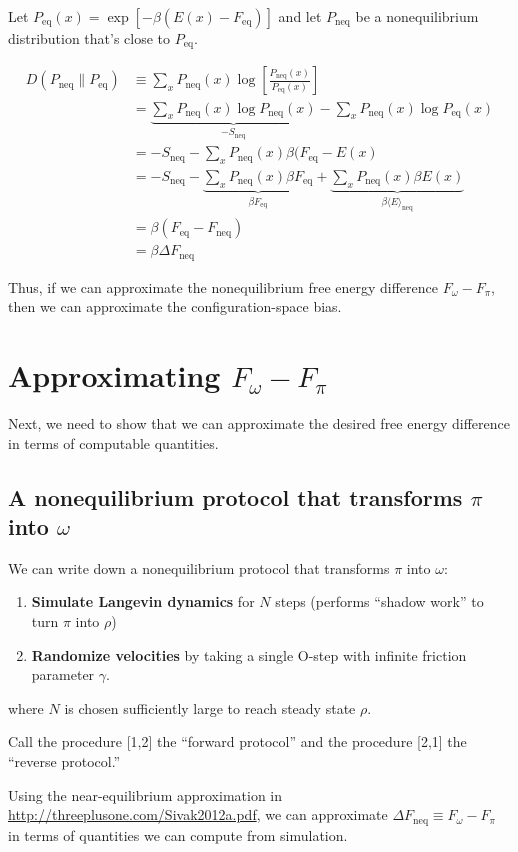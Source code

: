 \documentclass[11pt]{article}
\newcommand{\feq}{F_\text{eq}}
\newcommand{\fneq}{F_\text{neq}}
\newcommand{\pneq}{P_\text{neq}}
\newcommand{\peq}{P_\text{eq}}
\newcommand{\sneq}{S_\text{neq}}
\begin{document}
Let $\peq(x) = \exp [-\beta (E (x) - \feq)]$ and let $\pneq$ be a nonequilibrium distribution that's close to $\peq$.

\begin{align}
D( \pneq \| \peq) &\equiv \sum_x \pneq(x) \log \left[\frac{\pneq(x)}{\peq (x)} \right]\\
&=\underbrace{ \sum_x \pneq(x) \log \pneq(x) }_{- \sneq } - \sum_x \pneq(x) \log \peq (x)\\
&= - \sneq - \sum_x \pneq(x) \beta (\feq - E(x)\\
&= - \sneq - \underbrace{\sum_x \pneq(x) \beta \feq}_{\beta \feq} + \underbrace{\sum_x \pneq(x) \beta E(x)}_{\beta \langle E \rangle_\text{neq}}\\
&= \beta (\feq - \fneq)\\
&= \beta \Delta \fneq
\end{align}

Thus, if we can approximate the nonequilibrium free energy difference $F_\omega - F_\pi$, then we can approximate the configuration-space bias.


\section{Approximating $F_\omega - F_\pi$}
Next, we need to show that we can approximate the desired free energy difference in terms of computable quantities.
\subsection{A nonequilibrium protocol that transforms $\pi$ into $\omega$}
We can write down a nonequilibrium protocol that transforms $\pi$ into $\omega$:
\begin{enumerate}
\item \textbf{Simulate Langevin dynamics} for $N$ steps (performs ``shadow work'' to turn $\pi$ into $\rho$)
\item \textbf{Randomize velocities} by taking a single O-step with infinite friction parameter $\gamma$.
\end{enumerate}
where $N$ is chosen sufficiently large to reach steady state $\rho$.

Call the procedure [1,2] the ``forward protocol'' and the procedure [2,1] the ``reverse protocol.''

Using the near-equilibrium approximation in \url{http://threeplusone.com/Sivak2012a.pdf}, we can approximate $\Delta F_\text{neq} \equiv F_\omega - F_\pi$  in terms of quantities we can compute from simulation.
\end{document}
